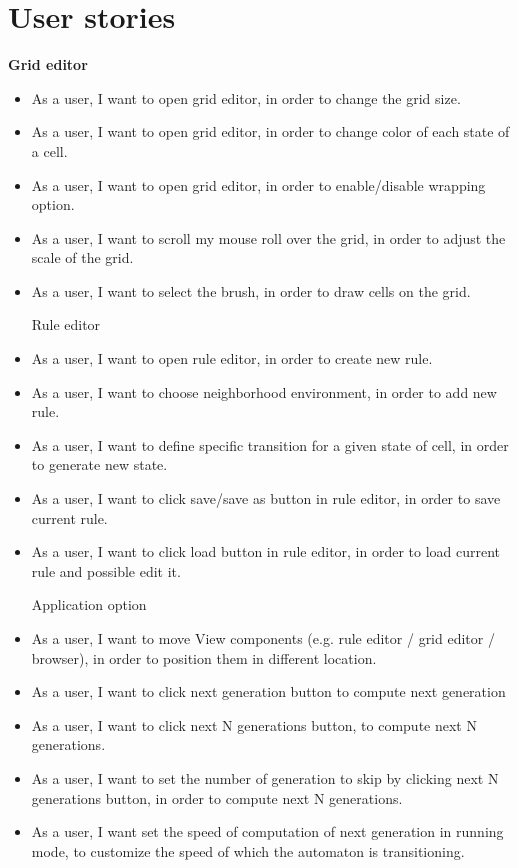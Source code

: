 \documentclass{article}
\begin{document}
\section{User stories}
	\hspace{15pt} {\bf Grid editor}
\begin{itemize}	
	\item 
		As a user, 
		I want to open grid editor,
		in order to change the grid size.

	\item 
		As a user, 
		I want to open grid editor,
		in order to change color of each state of a cell.

	\item 
		As a user, 
		I want to open grid editor,
		in order to enable/disable wrapping option.

	\item 
		As a user, 
		I want to scroll my mouse roll over the grid,
		in order to adjust the scale of the grid.

	\item 
		As a user, 
		I want to select the brush,
		in order to draw cells on the grid.

	\vspace{30pt}
	Rule editor
	
	\item 
		As a user,
		I want to open rule editor,
		in order to create new rule.
		
	\item 
		As a user,
		I want to choose neighborhood environment,
		in order to add new rule.
		
	\item 
		As a user,
		I want to define specific transition for a given state of cell,
		in order to generate new state.
		
	\item 
		As a user,
		I want to click save/save as button in rule editor,
		in order to save current rule.

	\item 
		As a user,
		I want to click load button in rule editor,
		in order to load current rule and possible edit it.

	\vspace{30pt}
	Application option
	
	\item 
		As a user,
		I want to move View components (e.g. rule editor / grid editor / browser),
		in order to position them in different location.
	\item 
		As a user,
		I want to click next generation button 
		to compute next generation
	\item 
		As a user,
		I want to click next N generations button,
		to compute next N generations.
	\item 
		As a user,
		I want to set the number of generation to skip by clicking next N generations button,
		in order to compute next N generations.
	\item 
		As a user,
		I want set the speed of computation of next generation in running mode,
		to customize the speed of which the automaton is transitioning. \\
		

\end{itemize}
\end{document}
